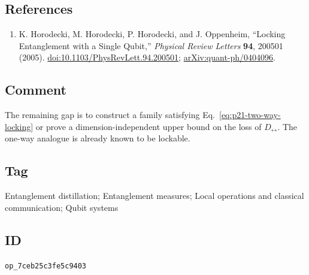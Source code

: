 \subsection*{References}

\begin{enumerate}[label={},leftmargin=4.8em,labelsep=0.5em]
  \footnotesize
  \item[\textup{[HHHO05]}]\label{ref:p21-locking}
  K. Horodecki, M. Horodecki, P. Horodecki, and J. Oppenheim,
  ``Locking Entanglement with a Single Qubit,''
  \emph{Physical Review Letters} \textbf{94}, 200501 (2005).
  \href{https://doi.org/10.1103/PhysRevLett.94.200501}{doi:10.1103/PhysRevLett.94.200501};
  \href{https://arxiv.org/abs/quant-ph/0404096}{arXiv:quant-ph/0404096}.
\end{enumerate}

\subsection*{Comment}

The remaining gap is to construct a family satisfying
Eq.~\eqref{eq:p21-two-way-locking} or prove a dimension-independent upper
bound on the loss of $D_{\leftrightarrow}$.  The one-way analogue is already
known to be lockable.

\subsection*{Tag}

Entanglement distillation; Entanglement measures;
Local operations and classical communication; Qubit systems

\subsection*{ID}

\texttt{op\_7ceb25c3fe5c9403}
